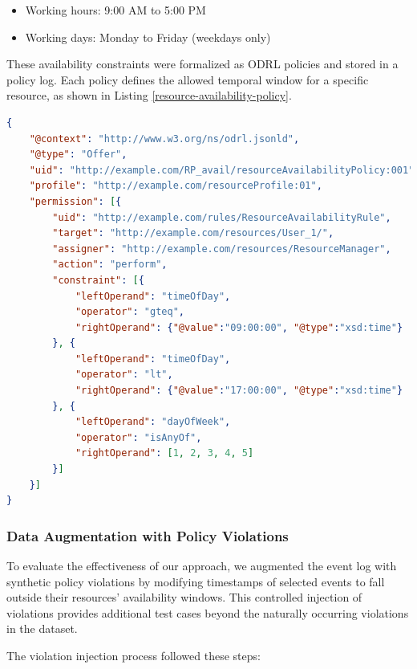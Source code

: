 \begin{itemize}
    \item Working hours: 9:00 AM to 5:00 PM
    \item Working days: Monday to Friday (weekdays only)
\end{itemize}

These availability constraints were formalized as ODRL policies and stored in a policy log. Each policy defines the allowed temporal window for a specific resource, as shown in Listing \ref{resource-availability-policy}.

\begin{lstlisting}[language=json,firstnumber=1,caption={Resource availability policy example},label=resource-availability-policy]
{
    "@context": "http://www.w3.org/ns/odrl.jsonld",
    "@type": "Offer",
    "uid": "http://example.com/RP_avail/resourceAvailabilityPolicy:001",
    "profile": "http://example.com/resourceProfile:01",
    "permission": [{     
        "uid": "http://example.com/rules/ResourceAvailabilityRule",
        "target": "http://example.com/resources/User_1/",  
        "assigner": "http://example.com/resources/ResourceManager",    
        "action": "perform",
        "constraint": [{
            "leftOperand": "timeOfDay",
            "operator": "gteq",
            "rightOperand": {"@value":"09:00:00", "@type":"xsd:time"}
        }, {
            "leftOperand": "timeOfDay",
            "operator": "lt",
            "rightOperand": {"@value":"17:00:00", "@type":"xsd:time"}
        }, {
            "leftOperand": "dayOfWeek",
            "operator": "isAnyOf",
            "rightOperand": [1, 2, 3, 4, 5]
        }]
    }]
}
\end{lstlisting}

\subsubsection{Data Augmentation with Policy Violations}
To evaluate the effectiveness of our approach, we augmented the event log with synthetic policy violations by modifying timestamps of selected events to fall outside their resources' availability windows. This controlled injection of violations provides additional test cases beyond the naturally occurring violations in the dataset.

The violation injection process followed these steps:

